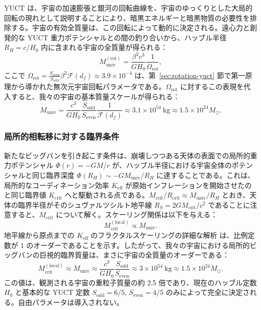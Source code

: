 \documentclass[11pt,a4paper]{article}
\begin{document}
	YUCT は、宇宙の加速膨張と銀河の回転曲線を、宇宙のゆっくりとした大局的回転の現れとして説明することにより、暗黒エネルギーと暗黒物質の必要性を排除する。宇宙の有効全質量は、この回転によって動的に決定される。遠心力と創発的な YUCT 重力ポテンシャルとの間の釣り合いから、ハッブル半径 \(R_H = c/H_0\) 内に含まれる宇宙の全質量が得られる：
	\begin{equation}
		M_{\mathrm{univ}}^{\mathrm{(rot)}} = \frac{\beta^2 c^3}{G H_0} \frac{1}{\Omega_{\mathrm{rot}}},
	\end{equation}
	ここで \(\Omega_{\mathrm{rot}} = \frac{S_{\mathrm{even}}}{S_{\mathrm{odd}}} \beta^2 \mathcal{F}(d_f) \approx 3.9 \times 10^{-4}\) は、第~\ref{sec:rotation-yuct} 節で第一原理から導かれた無次元宇宙回転パラメータである。\(\Omega_{\mathrm{rot}}\) に対するこの表現を代入すると、我々の宇宙の基本質量スケールが得られる：
	\begin{equation}
		M_{\mathrm{univ}} = \frac{c^3}{G H_0} \frac{S_{\mathrm{odd}}}{S_{\mathrm{even}}} \frac{1}{\mathcal{F}(d_f)} \approx 3.1 \times 10^{54}\ \mathrm{kg} \approx 1.5 \times 10^{24} M_{\odot}.
	\end{equation}
	
	\subsubsection{局所的相転移に対する臨界条件}
	
	新たなビッグバンを引き起こす条件は、崩壊しつつある天体の表面での局所的重力ポテンシャル \(\Phi(r) = -GM/r\) が、ハッブル半径における宇宙全体のポテンシャルと同じ臨界深度 \(\Phi(R_H) \sim -G M_{\mathrm{univ}}/R_H\) に達することである。これは、局所的なコーディネーション効率 \(K_{\mathrm{eff}}\) が原始インフレーションを開始させたのと同じ臨界値 \(K_{\mathrm{crit}}\) へと駆動される点である。\(M_{\mathrm{crit}}/R_{\mathrm{crit}} \approx M_{\mathrm{univ}}/R_H\) とおき、天体の臨界半径がそのシュヴァルツシルト地平線 \(R_S = 2GM_{\mathrm{crit}}/c^2\) であることに注意すると、\(M_{\mathrm{crit}}\) について解く。スケーリング関係は以下を与える：
	\begin{equation}
		M_{\mathrm{crit}}^{\mathrm{(local)}} \propto M_{\mathrm{univ}}.
	\end{equation}
	地平線から原点までの \(K_{\mathrm{eff}}\) のフラクタルスケーリングの詳細な解析 \cite{AppendixL} は、比例定数が 1 のオーダーであることを示す。したがって、我々の宇宙における局所的ビッグバンの巨視的臨界質量は、まさに宇宙の全質量のオーダーである：
	\begin{equation}
		\boxed{ M_{\mathrm{crit}}^{\mathrm{(local)}} \approx M_{\mathrm{univ}} \approx \frac{c^3}{G H_0} \frac{S_{\mathrm{odd}}}{S_{\mathrm{even}}} \approx 3 \times 10^{54}\ \mathrm{kg} \approx 1.5 \times 10^{24} M_{\odot} }.
		\label{eq:Mcrit-macro}
	\end{equation}
	この値は、観測される宇宙の重粒子質量の約 2.5 倍であり、現在のハッブル定数 \(H_0\) と基本的な YUCT 定数 \(S_{\mathrm{odd}}=6/5\), \(S_{\mathrm{even}}=4/5\) のみによって完全に決定される。自由パラメータは導入されない。
	
\end{document}
